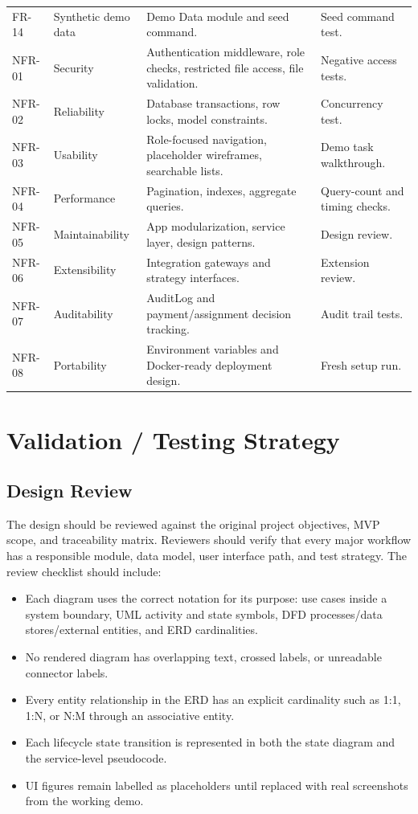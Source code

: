 \documentclass[11pt,a4paper]{article}
\begin{document}
\begin{longtable}{L{0.10\textwidth} L{0.25\textwidth} L{0.37\textwidth} L{0.17\textwidth}}
FR-14 & Synthetic demo data & Demo Data module and seed command. & Seed command test.\\
NFR-01 & Security & Authentication middleware, role checks, restricted file access, file validation. & Negative access tests.\\
NFR-02 & Reliability & Database transactions, row locks, model constraints. & Concurrency test.\\
NFR-03 & Usability & Role-focused navigation, placeholder wireframes, searchable lists. & Demo task walkthrough.\\
NFR-04 & Performance & Pagination, indexes, aggregate queries. & Query-count and timing checks.\\
NFR-05 & Maintainability & App modularization, service layer, design patterns. & Design review.\\
NFR-06 & Extensibility & Integration gateways and strategy interfaces. & Extension review.\\
NFR-07 & Auditability & AuditLog and payment/assignment decision tracking. & Audit trail tests.\\
NFR-08 & Portability & Environment variables and Docker-ready deployment design. & Fresh setup run.\\
\bottomrule
\end{longtable}

\section{Validation / Testing Strategy}

\subsection{Design Review}
The design should be reviewed against the original project objectives, MVP scope, and traceability matrix. Reviewers should verify that every major workflow has a responsible module, data model, user interface path, and test strategy. The review checklist should include:
\begin{itemize}
  \item Each diagram uses the correct notation for its purpose: use cases inside a system boundary, UML activity and state symbols, DFD processes/data stores/external entities, and ERD cardinalities.
  \item No rendered diagram has overlapping text, crossed labels, or unreadable connector labels.
  \item Every entity relationship in the ERD has an explicit cardinality such as 1:1, 1:N, or N:M through an associative entity.
  \item Each lifecycle state transition is represented in both the state diagram and the service-level pseudocode.
  \item UI figures remain labelled as placeholders until replaced with real screenshots from the working demo.
\end{itemize}
\end{document}
